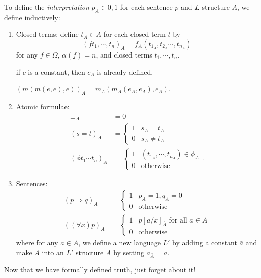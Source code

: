 \documentclass[a4paper]{article}
\begin{document}
\begin{defi}[Interpretation]
  To define the \emph{interpretation} $p_A\in {0, 1}$ for each sentence $p$ and $L$-structure $A$, we define inductively:
  \begin{enumerate}
    \item Closed terms: define $t_A\in A$ for each closed term $t$ by 
      \[
        (ft_1, \cdots, t_n)_A = f_A(t_{1_A}, t_{2_A}\cdots, t_{n_A})
      \]
      for any $f\in \Omega$, $\alpha(f) = n$, and closed terms $t_1, \cdots, t_n$.

      \note if $c$ is a constant, then $c_A$ is already defined.
      \begin{eg}
        $(m(m(e,e),e))_A = m_A(m_A(e_A, e_A),e_A)$.
      \end{eg}
    \item Atomic formulae:
      \begin{align*}
        \bot_A &= 0\\
        (s = t)_A &=
        \begin{cases}
          1 & s_A = t_A\\
          0 & s_A \not= t_A
        \end{cases}\\
        (\phi t_1 \cdots t_n)_A &=
        \begin{cases}
          1 & (t_{1_A}, \cdots, t_{n_A})\in \phi_A \\
          0 & \text{otherwise}
        \end{cases}.
      \end{align*}
    \item Sentences: 
      \begin{align*}
        (p\Rightarrow q)_A &=
        \begin{cases}
          1 & p_A = 1, q_A = 0\\
          0 & \text{otherwise}
        \end{cases}\\
        ((\forall x)p)_A &=
        \begin{cases}
          1 & p[\bar a/x]_{\bar A} \text{ for all }a\in A\\
          0 & \text{otherwise}
        \end{cases}
      \end{align*}
      where for any $a\in A$, we define a new language $L'$ by adding a constant $\bar a$ and make $A$ into an $L'$ structure $\bar A$ by setting $\bar a_{\bar A} = a$.
  \end{enumerate}
\end{defi}
Now that we have formally defined truth, just forget about it!
\end{document}
